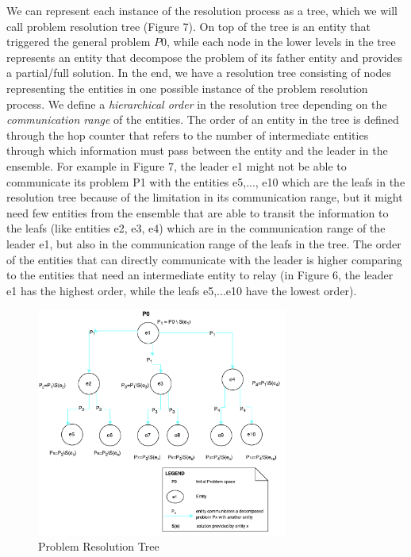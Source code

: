 \documentclass[journal]{IEEEtran}
\theoremstyle{definition}
\begin{document}



We can represent each instance of the resolution process as a tree, which we will call problem resolution tree (Figure 7). On top of the tree is an entity that triggered the general problem $P0$, while each node in the lower levels in the tree represents an entity that decompose the problem of its father entity and provides a partial/full solution. In the end, we have a resolution tree consisting of nodes representing the entities in one possible instance of the problem resolution process. We define a \textit{hierarchical order} in the resolution tree depending on the \textit{communication range} of the entities. The order of an entity in the tree  
is defined through the hop counter that refers to the number of intermediate entities through which information must pass between the entity and the leader in the ensemble. For example in Figure 7, the leader e1 might not be able to communicate its problem P1 with the entities e5,..., e10 which are the leafs in the resolution tree because of the limitation in its communication range, but it might need few entities from the ensemble that are able to transit the information to the leafs (like entities e2, e3, e4) which are in the communication range of the leader e1, but also in the communication range of the leafs in the tree. The order of the entities that can directly communicate with the leader is higher comparing to the entities that need an intermediate entity to relay (in Figure 6, the leader e1 has the highest order, while the leafs e5,...e10 have the lowest order).

\begin{figure}[h]
\includegraphics[width=3.25in]{Figures/ResolutionTree_F1.pdf}
\caption{Problem Resolution Tree}
\end{figure}
\end{document}

